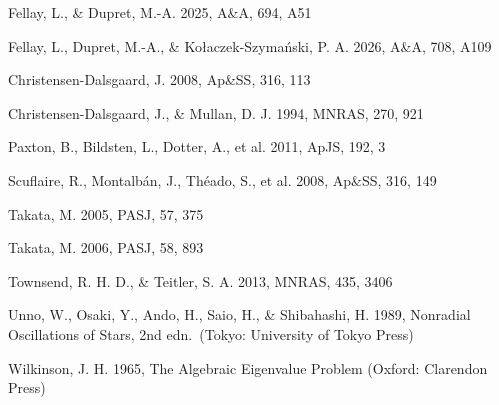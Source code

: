 \documentclass[]{aa}
\begin{document}
\begin{thebibliography}{}

Fellay, L., \& Dupret, M.-A. 2025, A\&A, 694, A51

Fellay, L., Dupret, M.-A., \& Ko\l{}aczek-Szyma\'nski, P. A. 2026,
A\&A, 708, A109

Christensen-Dalsgaard, J. 2008, Ap\&SS, 316, 113

Christensen-Dalsgaard, J., \& Mullan, D. J. 1994, MNRAS, 270, 921

Paxton, B., Bildsten, L., Dotter, A., et al. 2011, ApJS, 192, 3

Scuflaire, R., Montalb\'an, J., Th\'eado, S., et al. 2008, Ap\&SS, 316, 149

Takata, M. 2005, PASJ, 57, 375

Takata, M. 2006, PASJ, 58, 893

Townsend, R. H. D., \& Teitler, S. A. 2013, MNRAS, 435, 3406

Unno, W., Osaki, Y., Ando, H., Saio, H., \& Shibahashi, H. 1989, Nonradial
Oscillations of Stars, 2nd edn.\ (Tokyo: University of Tokyo Press)

Wilkinson, J. H. 1965, The Algebraic Eigenvalue Problem (Oxford: Clarendon
Press)

\end{thebibliography}
\end{document}
